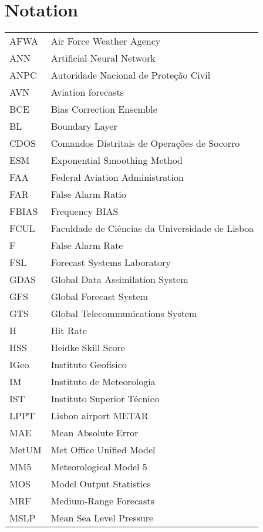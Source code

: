 \chapter{Notation}
\label{sec:notation}

\begin{longtable}{ll}
AFWA    & Air Force Weather Agency  \\
ANN     & Artificial Neural Network \\
ANPC    & Autoridade Nacional de Prote\c{c}\~{a}o Civil \\
AVN     & Aviation forecasts \\
BCE     & Bias Correction Ensemble \\
BL      & Boundary Layer \\
CDOS    &  Comandos Distritais de Opera\c{c}\~{o}es de Socorro \\
ESM     & Exponential Smoothing Method \\
FAA     & Federal Aviation Administration \\
FAR     &  False Alarm Ratio \\
FBIAS   &  Frequency BIAS \\
FCUL    &  Faculdade de Ci\^{e}ncias da Universidade de Lisboa \\
F       &  False Alarm Rate \\
FSL     &  Forecast Systems Laboratory \\
GDAS    &  Global Data Assimilation System \\
GFS     &  Global Forecast System \\
GTS     &  Global Telecommunications System \\
H       &  Hit Rate \\
HSS     &  Heidke Skill Score \\
IGeo    &  Instituto Geof\'{i}sico \\
IM      &  Instituto de Meteorologia \\
IST     &  Instituto Superior T\'{e}cnico \\
LPPT    &  Lisbon airport METAR \\
MAE     &  Mean Absolute Error \\
MetUM   &  Met Office Unified Model \\
MM5     &  Meteorological Model 5 \\
MOS     &  Model Output Statistics \\
MRF     &  Medium-Range Forecasts \\
MSLP    &  Mean Sea Level Pressure \\

\end{longtable}
